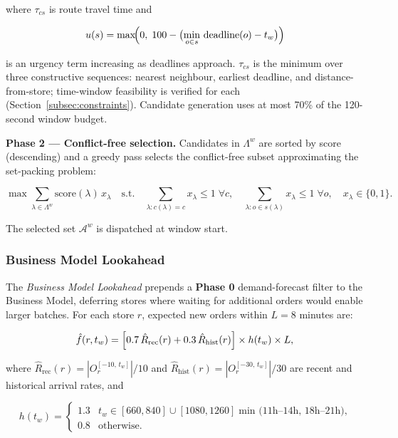 where $\tau_{cs}$ is route travel time and

\begin{equation}\label{eq:urgency}
    u(s) = \max\!\Bigl(0,\;100 - \bigl(\min_{o \in s}\,\text{deadline}(o) - t_w\bigr)\Bigr)
\end{equation}

is an urgency term increasing as deadlines approach.
$\tau_{cs}$ is the minimum over three constructive sequences: nearest neighbour, earliest deadline, and distance-from-store; time-window feasibility is verified for each (Section~\ref{subsec:constraints}).
Candidate generation uses at most 70\% of the 120-second window budget.

\textbf{Phase 2 — Conflict-free selection.}
Candidates in $\Lambda^w$ are sorted by score (descending) and a greedy pass selects the conflict-free subset approximating the set-packing problem:

\begin{equation}\label{eq:set_packing}
    \max \sum_{\lambda \in \Lambda^w} \text{score}(\lambda)\,x_\lambda
    \quad\text{s.t.}\quad
    \sum_{\lambda: c(\lambda)=c} x_\lambda \leq 1\;\forall c,\quad
    \sum_{\lambda: o \in s(\lambda)} x_\lambda \leq 1\;\forall o,\quad
    x_\lambda \in \{0,1\}.
\end{equation}

The selected set $\mathcal{A}^w$ is dispatched at window start.

\subsubsection{Business Model Lookahead}
\label{subsubsec:maxcover_la}

The \emph{Business Model Lookahead} prepends a \textbf{Phase 0} demand-forecast filter to the Business Model, deferring stores where waiting for additional orders would enable larger batches.
For each store $r$, expected new orders within $L=8$ minutes are:

\begin{equation}\label{eq:forecast}
    \hat{f}(r, t_w) =
    \Bigl[0.7\,\hat{R}_{\text{rec}}(r) + 0.3\,\hat{R}_{\text{hist}}(r)\Bigr]
    \times h(t_w) \times L,
\end{equation}

where $\hat{R}_{\text{rec}}(r) = |O_{r}^{[-10,\,t_w]}|/10$ and $\hat{R}_{\text{hist}}(r) = |O_{r}^{[-30,\,t_w]}|/30$ are recent and historical arrival rates, and

\begin{equation}\label{eq:hour_mult}
    h(t_w) =
    \begin{cases}
        1.3 & t_w \in [660, 840] \cup [1080, 1260]\;\text{min (11h--14h, 18h--21h),} \\
        0.8 & \text{otherwise.}
    \end{cases}
\end{equation}

